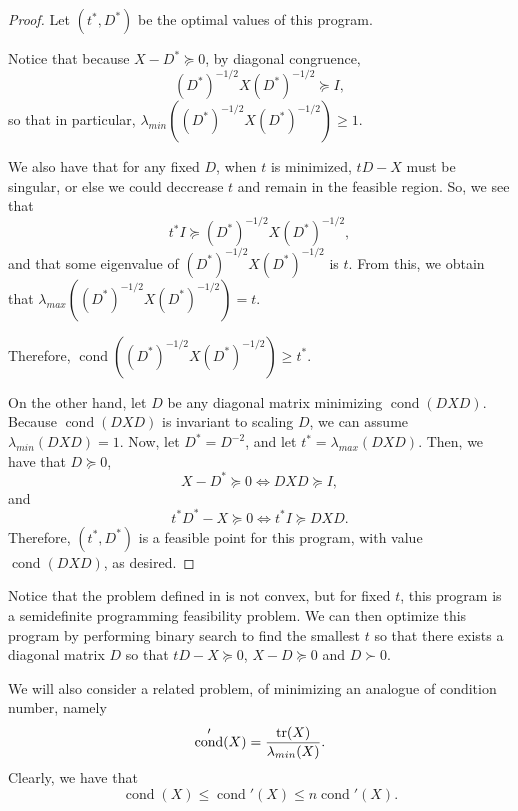 \documentclass{amsart}
\theoremstyle{definition}
\newcommand{\tr}{\textup{tr}}
\DeclareMathOperator{\cond}{cond}
\begin{document}
\begin{proof}
    Let $(t^*,D^*)$ be the optimal values of this program.
    
    Notice that because $X - D^* \succeq 0$, by diagonal congruence,
    \[
        (D^*)^{-1/2}X(D^*)^{-1/2} \succeq I,
    \]
    so that in particular, $\lambda_{min}((D^*)^{-1/2}X(D^*)^{-1/2}) \ge 1$.
    
    We also have that for any fixed $D$, when $t$ is minimized, $tD - X$ must be singular, or else we could deccrease $t$ and remain in the feasible region.
    So, we see that
    \[
        t^*I \succeq (D^*)^{-1/2}X(D^*)^{-1/2},
    \]
    and that some eigenvalue of $(D^*)^{-1/2}X(D^*)^{-1/2}$ is $t$. From this, we obtain that $\lambda_{max}((D^*)^{-1/2}X(D^*)^{-1/2}) = t$.

    Therefore, $\cond((D^*)^{-1/2}X(D^*)^{-1/2}) \ge t^*$.

    On the other hand, let $D$ be any diagonal matrix minimizing $\cond(DXD)$. Because $\cond(DXD)$ is invariant to scaling $D$, we can assume $\lambda_{min}(DXD) = 1$.
    Now, let $D^* = D^{-2}$, and let $t^* = \lambda_{max}(DXD)$. Then, we have that $D \succeq 0$,
    \[
        X - D^* \succeq 0 \Leftrightarrow DXD \succeq I,
    \]
    and
    \[
        t^*D^* - X \succeq 0 \Leftrightarrow t^* I \succeq DXD.
    \]
    Therefore, $(t^*, D^*)$ is a feasible point for this program, with value $\cond(DXD)$, as desired.

\end{proof}
Notice that the problem defined in  is not convex, but for fixed $t$, this program is a semidefinite programming feasibility problem. We can then optimize this program by performing binary search to find the smallest $t$ so that there exists a diagonal matrix $D$ so that $tD - X \succeq 0$, $X - D \succeq 0$ and $D \succ 0$.


We will also consider a related problem, of minimizing an analogue of condition number, namely 
\[
    \cond'(X) = \frac{\tr(X)}{\lambda_{min}(X)}.
\]
Clearly, we have that 
\[
    \cond(X) \le \cond'(X) \le n\cond'(X).
\]
\end{document}
